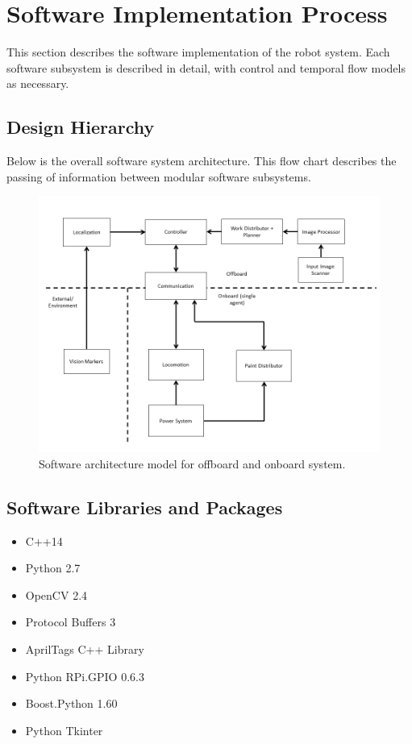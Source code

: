 
\section{Software Implementation Process}
\label{sec:software_implementation}
This section describes the software implementation of the robot system. Each software subsystem is described in detail, with control and temporal flow models as necessary.

\subsection{Design Hierarchy}
\label{sec:software_design}
Below is the overall software system architecture. This flow chart describes the passing of information between modular software subsystems.

\begin{figure}
\centering
\includegraphics[width=0.9\columnwidth]{figs/systems_diagram.png}
\caption{Software architecture model for offboard and onboard system.}
\label{fig:software_design_arch}
\end{figure}

\subsection{Software Libraries and Packages}
\label{sec:software_libraries}
\begin{itemize}
  \item C++14
  \item Python 2.7 \cite{python27}
  \item OpenCV 2.4 \cite{opencv24}
  \item Protocol Buffers 3 \cite{protobuf3}
  \item AprilTags C++ Library \cite{apriltags}
  \item Python RPi.GPIO 0.6.3 \cite{python_rpigpio}
  \item Boost.Python 1.60 \cite{python_boost}
  \item Python Tkinter \cite{python_tkinter}
\end{itemize}









